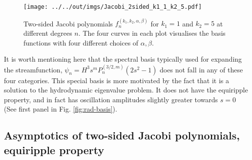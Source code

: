 \begin{figure}[htbp]
    \centering
    \texttt{[image: ../../out/imgs/Jacobi\_2sided\_k1\_1\_k2\_5.pdf]}
    \caption{Two-sided Jacobi polynomials $f_n^{(k_1, k_2, \alpha, \beta)}$ for $k_1 = 1$ and $k_2 = 5$ at different degrees $n$. The four curves in each plot visualises the basis functions with four different choices of $\alpha, \beta$.}
    \label{fig:Jacobi-2-sided}
\end{figure}

It is worth mentioning here that the spectral basis typically used for expanding the streamfunction, $\psi_n = H^3 s^m P_n^{(3/2, m)}(2s^2 - 1)$ does not fall in any of these four categories. This special basis is more motivated by the fact that it is a solution to the hydrodynamic eigenvalue problem. It does not have the equiripple property, and in fact has oscillation amplitudes slightly greater towards $s=0$ (See first panel in Fig. \ref{fig:rad-basis}).



\subsection{Asymptotics of two-sided Jacobi polynomials, equiripple property}

